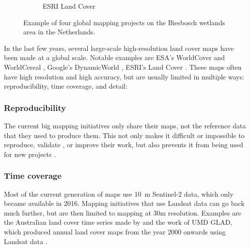 \begin{figure}[H]
\begin{subfigure}[b]{0.48\textwidth}
        \caption{ESRI Land Cover}
        \label{fig:lc_esri}
    \end{subfigure}
    
    \caption{Example of four global mapping projects on the Biesbosch wetlands area in the Netherlands.}
    \label{fig:bigmaps_biesbosch}
\end{figure}
    
    In the last few years, several large-scale high-resolution land cover maps have been made at a global scale. Notable examples are ESA's WorldCover \citep{kerchove2021esa} and WorldCereal \citep{tricht2023worldcereal}, Google's DynamicWorld \citep{brown2022dynamic}, ESRI's Land Cover \citep{karra2021global}.
    These maps often have high resolution and high accuracy, but are usually limited in multiple ways: reproducibility, time coverage, and detail:
    
    \subsubsection{Reproducibility}
        The current big mapping initiatives only share their maps, not the reference data that they used to produce them. This not only makes it difficult or impossible to reproduce, validate \citep{venter2022global}, or improve their work, but also prevents it from being used for new projects \citep{tsendbazar2015assessing}.
    
    \subsubsection{Time coverage} 
        Most of the current generation of maps use 10~m Sentinel-2 data, which only became available in 2016. Mapping initiatives that use Landsat data can go back much further, but are then limited to mapping at 30m resolution. Examples are the Australian land cover time series made by \citep{calderon2021high} and the work of UMD GLAD, which produced annual land cover maps from the year 2000 onwards using Landsat data \citep{hansen2022global}.

